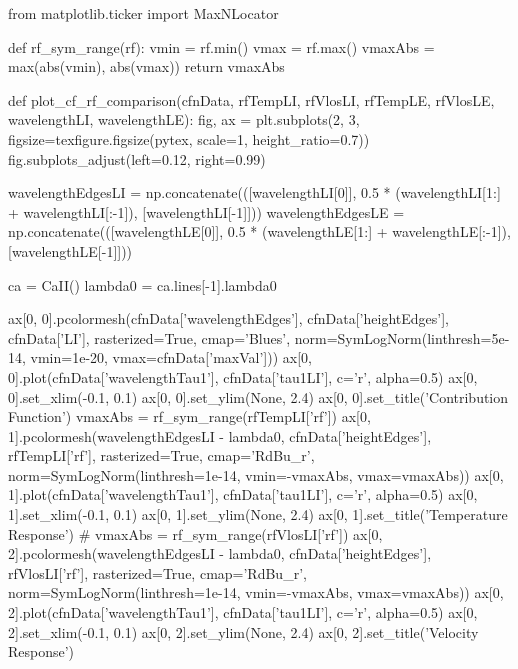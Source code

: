 \begin{pycode}[TimeDepRT]
from matplotlib.ticker import MaxNLocator

def rf_sym_range(rf):
    vmin = rf.min()
    vmax = rf.max()
    vmaxAbs = max(abs(vmin), abs(vmax))
    return vmaxAbs

def plot_cf_rf_comparison(cfnData, rfTempLI, rfVlosLI,
                          rfTempLE, rfVlosLE, wavelengthLI, wavelengthLE):
    fig, ax = plt.subplots(2, 3, figsize=texfigure.figsize(pytex, scale=1, height_ratio=0.7))
    fig.subplots_adjust(left=0.12, right=0.99)

    wavelengthEdgesLI = np.concatenate(([wavelengthLI[0]],
                                        0.5 * (wavelengthLI[1:] + wavelengthLI[:-1]),
                                        [wavelengthLI[-1]]))
    wavelengthEdgesLE = np.concatenate(([wavelengthLE[0]],
                                        0.5 * (wavelengthLE[1:] + wavelengthLE[:-1]),
                                        [wavelengthLE[-1]]))

    ca = CaII()
    lambda0 = ca.lines[-1].lambda0

    ax[0, 0].pcolormesh(cfnData['wavelengthEdges'], cfnData['heightEdges'], cfnData['LI'],
                        rasterized=True, cmap='Blues',
                        norm=SymLogNorm(linthresh=5e-14, vmin=1e-20, vmax=cfnData['maxVal']))
    ax[0, 0].plot(cfnData['wavelengthTau1'], cfnData['tau1LI'], c='r', alpha=0.5)
    ax[0, 0].set_xlim(-0.1, 0.1)
    ax[0, 0].set_ylim(None, 2.4)
    ax[0, 0].set_title('Contribution Function')
    vmaxAbs = rf_sym_range(rfTempLI['rf'])
    ax[0, 1].pcolormesh(wavelengthEdgesLI - lambda0, cfnData['heightEdges'], rfTempLI['rf'],
                        rasterized=True, cmap='RdBu_r',
                        norm=SymLogNorm(linthresh=1e-14, vmin=-vmaxAbs, vmax=vmaxAbs))
    ax[0, 1].plot(cfnData['wavelengthTau1'], cfnData['tau1LI'], c='r', alpha=0.5)
    ax[0, 1].set_xlim(-0.1, 0.1)
    ax[0, 1].set_ylim(None, 2.4)
    ax[0, 1].set_title('Temperature Response')
    # vmaxAbs = rf_sym_range(rfVlosLI['rf'])
    ax[0, 2].pcolormesh(wavelengthEdgesLI - lambda0, cfnData['heightEdges'], rfVlosLI['rf'],
                        rasterized=True, cmap='RdBu_r',
                        norm=SymLogNorm(linthresh=1e-14, vmin=-vmaxAbs, vmax=vmaxAbs))
    ax[0, 2].plot(cfnData['wavelengthTau1'], cfnData['tau1LI'], c='r', alpha=0.5)
    ax[0, 2].set_xlim(-0.1, 0.1)
    ax[0, 2].set_ylim(None, 2.4)
    ax[0, 2].set_title('Velocity Response')


\end{pycode}
